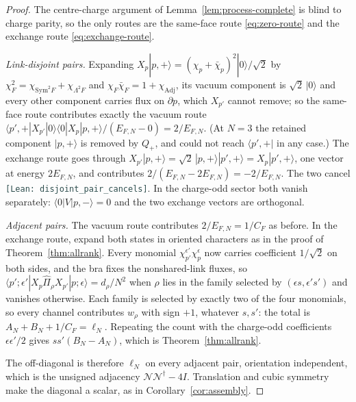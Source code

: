 \documentclass[11pt]{article}
\theoremstyle{plain}
\theoremstyle{definition}
\theoremstyle{remark}
\newcommand{\chk}[1]{}
\newcommand{\leanref}[1]{{\footnotesize\textcolor{DarkSlateGray}{\texttt{[Lean: #1]}}}}
\newcommand{\CF}{C_F}
\newcommand{\dg}{^{\dagger}}
\begin{document}
\begin{proof}
The centre-charge argument of Lemma~\ref{lem:process-complete} is blind to
charge parity, so the only routes are the same-face route
\eqref{eq:zero-route} and the exchange route \eqref{eq:exchange-route}.

\emph{Link-disjoint pairs.} Expanding
$X_p|p,+\rangle=(\chi_p+\bar\chi_p)^2|0\rangle/\sqrt2$ by
$\chi_F^2=\chi_{\mathrm{Sym}^2F}+\chi_{\Lambda^2F}$ and
$\chi_F\bar\chi_F=1+\chi_{\mathrm{Adj}}$, its vacuum component is
$\sqrt2\,|0\rangle$ and every other component carries flux on $\partial p$,
which $X_{p'}$ cannot remove; so the same-face route contributes exactly the
vacuum route
$\langle p',+|X_{p'}|0\rangle\langle0|X_p|p,+\rangle/(E_{F,N}-0)=2/E_{F,N}$.
(At $N=3$ the retained component $|p,+\rangle$ is removed by $Q_+$, and could
not reach $\langle p',+|$ in any case.) The exchange route goes through
$X_{p'}|p,+\rangle=\sqrt2\,|p,+\rangle|p',+\rangle=X_p|p',+\rangle$, one
vector at energy $2E_{F,N}$, and contributes
$2/(E_{F,N}-2E_{F,N})=-2/E_{F,N}$. The two cancel
\leanref{disjoint\_pair\_cancels}. In the charge-odd sector both vanish
separately: $\langle0|V|p,-\rangle=0$ and the two exchange vectors are
orthogonal.

\emph{Adjacent pairs.} The vacuum route contributes $2/E_{F,N}=1/\CF$ as
before. In the exchange route, expand both states in oriented characters as
in the proof of Theorem~\ref{thm:allrank}. Every monomial
$\chi_{p'}^{\epsilon'}\chi_p^{\epsilon}$ now carries coefficient $1/\sqrt2$ on
both sides, and the bra fixes the nonshared-link fluxes, so
$\langle p';\epsilon'|X_p\widehat\Pi_\rho X_{p'}|p;\epsilon\rangle=d_\rho/N^2$
when $\rho$ lies in the family selected by $(\epsilon s,\epsilon's')$ and
vanishes otherwise. Each family is selected by exactly two of the four
monomials, so every channel contributes $w_\rho$ with sign $+1$, whatever
$s,s'$: the total is $A_N+B_N+1/\CF=\ell_N$. Repeating the count with the
charge-odd coefficients $\epsilon\epsilon'/2$ gives $ss'(B_N-A_N)$, which is
Theorem~\ref{thm:allrank}.

The off-diagonal is therefore $\ell_N$ on every adjacent pair, orientation
independent, which is the unsigned adjacency $\mathcal N\mathcal N\dg-4I$.
Translation and cubic symmetry make the diagonal a scalar, as in
Corollary~\ref{cor:assembly}.
\end{proof}
\chk{the charge-even second-order symbol is ell\_N times the unsigned incidence: the vacuum route cancels the doubly-excited route on every link-disjoint pair}
\end{document}
